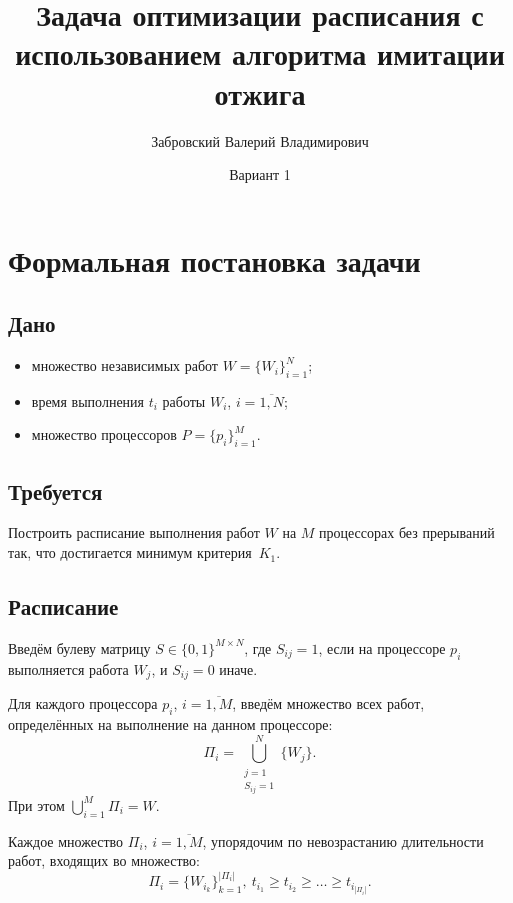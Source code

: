 \documentclass[12pt]{article}
\title{Задача оптимизации расписания с использованием алгоритма имитации отжига}
\author{Забровский Валерий Владимирович}
\date{Вариант 1}
\begin{document}
\maketitle

\section*{Формальная постановка задачи}

\subsection*{Дано}
\begin{itemize}
    \item множество независимых работ $W = \{W_i\}_{i=1}^{N}$;
    \item время выполнения $t_i$ работы $W_i$, $i = \overline{1, N}$;
    \item множество процессоров $P = \{p_i\}_{i=1}^{M}$.
\end{itemize}

\subsection*{Требуется}
Построить расписание выполнения работ $W$ на $M$ процессорах без прерываний так,
что достигается минимум критерия~\hyperref[crit]{$K_1$}.

\subsection*{Расписание}

Введём булеву матрицу $S \in \{0, 1\}^{M \times N}$,
где $S_{ij} = 1$, если на процессоре $p_i$ выполняется работа $W_j$,
и $S_{ij} = 0$ иначе.

Для каждого процессора $p_i$, $i = \overline{1, M}$, введём множество
всех работ, определённых на выполнение на данном процессоре:
\begin{equation}
    \Pi_i = \bigcup\limits_{\substack{j=1 \\ S_{ij}=1}}^N \{W_j\}.
\end{equation}
При этом $\bigcup\limits_{i=1}^M \Pi_i = W$.

Каждое множество $\Pi_i$, $i = \overline{1, M}$, упорядочим по невозрастанию
длительности работ, входящих во множество:
\begin{equation}
    \Pi_i = \{W_{i_k}\}_{k=1}^{|\Pi_i|},~
    t_{i_1} \geq t_{i_2} \geq \dots \geq t_{i_{|\Pi_i|}}.
\end{equation}
\end{document}
